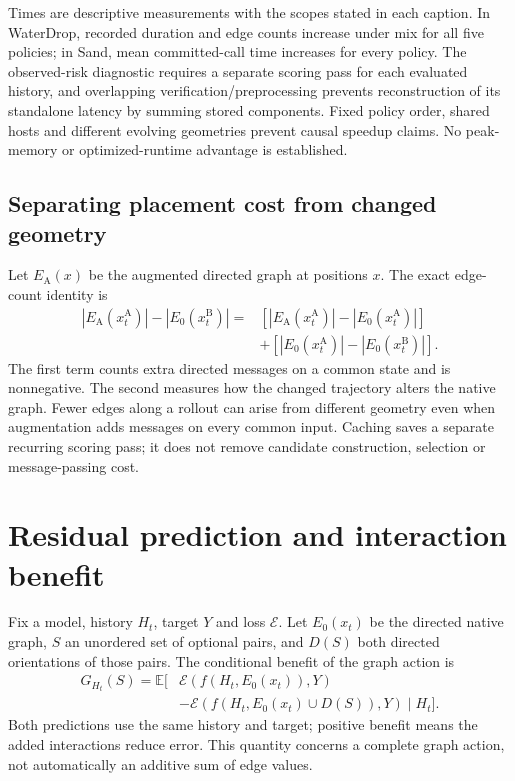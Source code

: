 Times are descriptive measurements with the scopes stated in each caption. In WaterDrop, recorded duration and edge counts increase under mix for all five policies; in Sand, mean committed-call time increases for every policy. The observed-risk diagnostic requires a separate scoring pass for each evaluated history, and overlapping verification/preprocessing prevents reconstruction of its standalone latency by summing stored components. Fixed policy order, shared hosts and different evolving geometries prevent causal speedup claims. No peak-memory or optimized-runtime advantage is established.

\subsection{Separating placement cost from changed geometry}
Let $E_{\mathrm A}(x)$ be the augmented directed graph at positions $x$. The exact edge-count identity is
\begin{align}
 |E_{\mathrm A}(x_t^{\mathrm A})|-|E_0(x_t^{\mathrm B})|
 ={}&[|E_{\mathrm A}(x_t^{\mathrm A})|-|E_0(x_t^{\mathrm A})|]\nonumber\\
 &+[|E_0(x_t^{\mathrm A})|-|E_0(x_t^{\mathrm B})|].
 \label{eq:decomposition}
\end{align}
The first term counts extra directed messages on a common state and is nonnegative. The second measures how the changed trajectory alters the native graph. Fewer edges along a rollout can arise from different geometry even when augmentation adds messages on every common input. Caching saves a separate recurring scoring pass; it does not remove candidate construction, selection or message-passing cost.

\section{Residual prediction and interaction benefit}
\label{sec:benefit-derivations}
Fix a model, history $H_t$, target $Y$ and loss $\mathcal E$. Let $E_0(x_t)$ be the directed native graph, $S$ an unordered set of optional pairs, and $D(S)$ both directed orientations of those pairs. The conditional benefit of the graph action is
\begin{align}
 G_{H_t}(S)=\mathbb E[&\mathcal E(f(H_t,E_0(x_t)),Y)\nonumber\\
              &-\mathcal E(f(H_t,E_0(x_t)\cup D(S)),Y)\mid H_t].
 \label{eq:conditional-benefit}
\end{align}
Both predictions use the same history and target; positive benefit means the added interactions reduce error. This quantity concerns a complete graph action, not automatically an additive sum of edge values.

